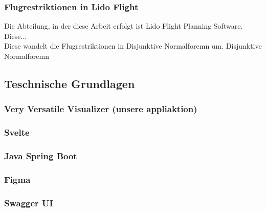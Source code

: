 \documentclass[a4paper,12pt]{article}
\begin{document}
 \subsubsection{Flugrestriktionen in Lido Flight}

Die Abteilung, in der diese Arbeit erfolgt ist Lido Flight Planning Software. Diese... \\
Diese wandelt die Flugrestriktionen in Disjunktive Normalforemn um. Disjunktive Normalforemn 
\subsection{Teschnische Grundlagen}
\subsubsection{Very Versatile Visualizer (unsere appliaktion)}
\subsubsection{Svelte}
\subsubsection{Java Spring Boot}
\subsubsection{Figma}
\subsubsection{Swagger UI}
\newpage
\end{document}
